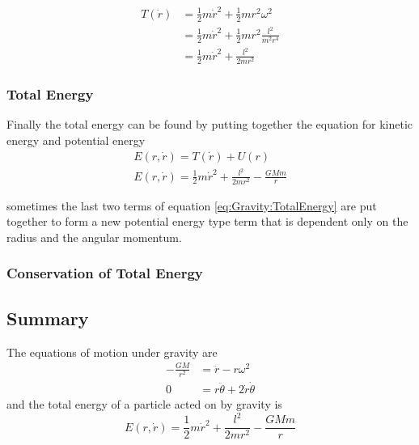 \begin{align}
T(\dot{r})&=\frac{1}{2}m \dot{r}^2 + \frac{1}{2}mr^2 \omega^2 \nonumber \\
&=\frac{1}{2}m \dot{r}^2 + \frac{1}{2}mr^2 \frac{l^2}{m^2r^4} \nonumber \\
&=\frac{1}{2}m \dot{r}^2 + \frac{l^2}{2mr^2} \label{eq:Gravity:KineticEnergyFinal}
\end{align}

\subsubsection{Total Energy}
Finally the total energy can be found by putting together the equation for kinetic energy and potential energy
\begin{align}
E(r,\dot{r})=T(\dot{r})+U(r) \nonumber \\
E(r,\dot{r})=\frac{1}{2}m \dot{r}^2 + \frac{l^2}{2mr^2}- \frac{GMm}{r}\label{eq:Gravity:TotalEnergy}
\end{align}

sometimes the last two terms of equation \ref{eq:Gravity:TotalEnergy} are put together to form a new potential energy type term that is dependent only on the radius and the angular momentum.

\subsubsection{Conservation of Total Energy}

\begin{framed}
\subsection{Summary}
The equations of motion under gravity are
\begin{align*}
-\frac{GM}{r^2} &=\ddot{r} - r \omega^2 \\
0 &=r \ddot{\theta} + 2 \dot{r} \dot{\theta}
\end{align*}
and the total energy of a particle acted on by gravity is
\begin{equation*}
E(r,\dot{r})=\frac{1}{2}m \dot{r}^2 + \frac{l^2}{2mr^2}- \frac{GMm}{r}
\end{equation*}
\end{framed}
